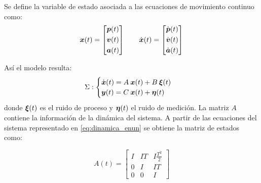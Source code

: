 
	Se define la variable de estado asociada a las ecuaciones de movimiento continuo como:
		\begin{equation*}
			\vect{x}(t) = \begin{bmatrix} \vect{p}(t) \\[0.3em] \vect{v}(t) \\[0.3em] \vect{a}(t) \end{bmatrix} \qquad%
			\dot{\vect{x}}(t) = \begin{bmatrix} \dot{\vect{p}}(t) \\[0.3em] \dot{\vect{v}}(t) \\[0.3em] \dot{\vect{a}}(t) \end{bmatrix}
		\end{equation*}

	Así el modelo resulta:
		\begin{equation*}
			\Sigma:
			\begin{cases}
				\dot{\boldsymbol{x}}(t) = A\: \boldsymbol{x}(t) + B \: \boldsymbol{\xi}(t) \\
				\boldsymbol{y}(t) = C\: \boldsymbol{x}(t) + \boldsymbol{\eta}(t)
			\end{cases}
		\end{equation*}
	donde $\boldsymbol{\xi}(t)$ es el ruido de proceso y $\boldsymbol{\eta}(t)$ el ruido de medición. La matriz $A$ contiene la información de la dinámica del sistema. A partir de las ecuaciones del sistema representado en \eqref{eq:dinamica_enun} se obtiene la matriz de estados como:

		\begin{equation*}
			A(t) = \begin{bmatrix} I & IT & I\frac{T^2}{2} \\[0.3em] 0 & I & IT \\[0.3em] 0 & 0 & I \end{bmatrix}
		\end{equation*}



